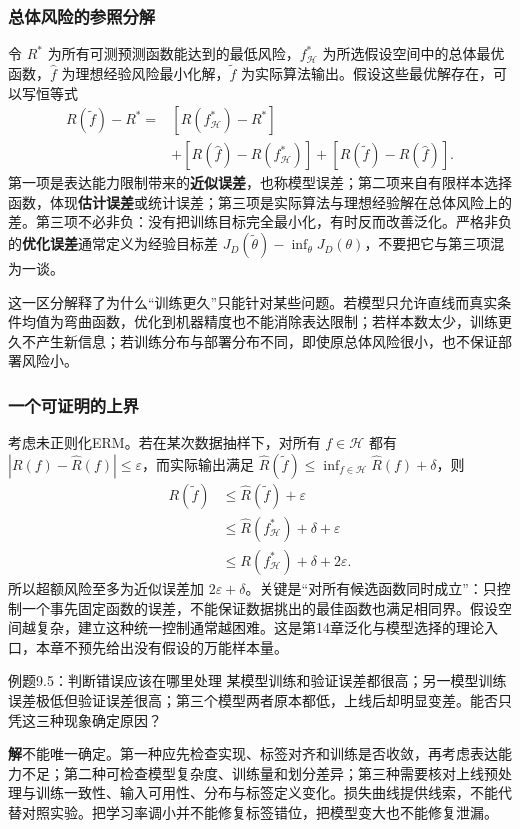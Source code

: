 \documentclass[UTF8,fontset=none,zihao=-4,a4paper]{ctexart}
\newcommand{\term}[1]{\textbf{#1}}
\newcommand{\sol}{\par\noindent\textbf{解}\quad}
\numberwithin{equation}{section}
\numberwithin{figure}{section}
\begin{document}
\subsubsection{总体风险的参照分解}
令 $R^*$ 为所有可测预测函数能达到的最低风险，$f_{\mathcal H}^*$ 为所选假设空间中的总体最优函数，$\widehat f$ 为理想经验风险最小化解，$\widetilde f$ 为实际算法输出。假设这些最优解存在，可以写恒等式
\begin{align*}
 R(\widetilde f)-R^*
 ={}&[R(f_{\mathcal H}^*)-R^*]\\
 &+[R(\widehat f)-R(f_{\mathcal H}^*)]
 +[R(\widetilde f)-R(\widehat f)].
\end{align*}
第一项是表达能力限制带来的\term{近似误差}，也称模型误差；第二项来自有限样本选择函数，体现\term{估计误差}或统计误差；第三项是实际算法与理想经验解在总体风险上的差。第三项不必非负：没有把训练目标完全最小化，有时反而改善泛化。严格非负的\term{优化误差}通常定义为经验目标差 $J_D(\widetilde\theta)-\inf_\theta J_D(\theta)$，不要把它与第三项混为一谈。

这一区分解释了为什么“训练更久”只能针对某些问题。若模型只允许直线而真实条件均值为弯曲函数，优化到机器精度也不能消除表达限制；若样本数太少，训练更久不产生新信息；若训练分布与部署分布不同，即使原总体风险很小，也不保证部署风险小。

\subsubsection{一个可证明的上界}
考虑未正则化ERM。若在某次数据抽样下，对所有 $f\in\mathcal H$ 都有 $|R(f)-\widehat R(f)|\leq\varepsilon$，而实际输出满足
$\widehat R(\widetilde f)\leq\inf_{f\in\mathcal H}\widehat R(f)+\delta$，则
\begin{align*}
 R(\widetilde f)
 &\leq\widehat R(\widetilde f)+\varepsilon\\
 &\leq\widehat R(f_{\mathcal H}^*)+\delta+\varepsilon\\
 &\leq R(f_{\mathcal H}^*)+\delta+2\varepsilon.
\end{align*}
所以超额风险至多为近似误差加 $2\varepsilon+\delta$。关键是“对所有候选函数同时成立”：只控制一个事先固定函数的误差，不能保证数据挑出的最佳函数也满足相同界。假设空间越复杂，建立这种统一控制通常越困难。这是第14章泛化与模型选择的理论入口，本章不预先给出没有假设的万能样本量。

\begin{infobox}{例题9.5：判断错误应该在哪里处理}
某模型训练和验证误差都很高；另一模型训练误差极低但验证误差很高；第三个模型两者原本都低，上线后却明显变差。能否只凭这三种现象确定原因？
\end{infobox}
\sol 不能唯一确定。第一种应先检查实现、标签对齐和训练是否收敛，再考虑表达能力不足；第二种可检查模型复杂度、训练量和划分差异；第三种需要核对上线预处理与训练一致性、输入可用性、分布与标签定义变化。损失曲线提供线索，不能代替对照实验。把学习率调小并不能修复标签错位，把模型变大也不能修复泄漏。
\end{document}
